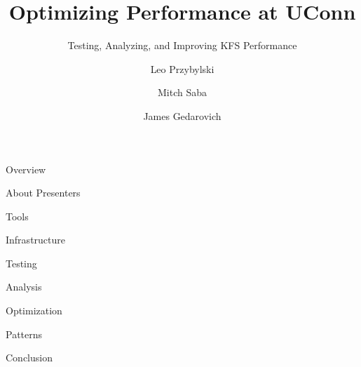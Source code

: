 \documentclass[xcolor=dvipsnames,14pt]{beamer}
\begin{document}
\title[A short proof]{Optimizing Performance at UConn}
\subtitle[Errors]{Testing, Analyzing, and Improving KFS Performance}
\author[Leo]{Leo Przybylski  \and Mitch Saba  \and James Gedarovich }



\begin{frame}[plain]
  \titlepage
\end{frame}

\begin{frame}{Overview}
\end{frame}

\begin{frame}{About Presenters}
\end{frame}

\begin{frame}{Tools}
\end{frame}

\begin{frame}{Infrastructure}
\end{frame}

\begin{frame}{Testing}
\end{frame}

\begin{frame}{Analysis}
\end{frame}

\begin{frame}{Optimization}
\end{frame}

\begin{frame}{Patterns}
\end{frame}

\begin{frame}{Conclusion}
\end{frame}
\end{document}
